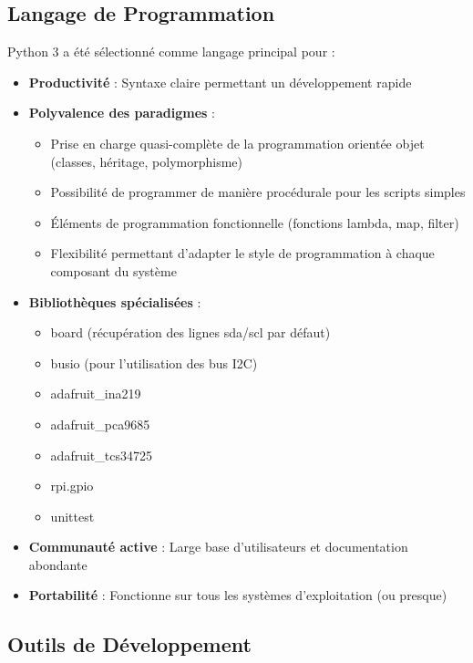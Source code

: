 \documentclass[a4paper, 12pt]{article}
\begin{document}
	
	\subsection{Langage de Programmation}
	
	Python 3 a été sélectionné comme langage principal pour :
	
	\begin{itemize}
		\item \textbf{Productivité} : Syntaxe claire permettant un développement rapide
		\item \textbf{Polyvalence des paradigmes} :
		\begin{itemize}
			\item Prise en charge quasi-complète de la programmation orientée objet (classes, héritage, polymorphisme)
			\item Possibilité de programmer de manière procédurale pour les scripts simples
			\item Éléments de programmation fonctionnelle (fonctions lambda, map, filter)
			\item Flexibilité permettant d'adapter le style de programmation à chaque composant du système
		\end{itemize}
		
		\item \textbf{Bibliothèques spécialisées} :
		\begin{itemize}
			\item board (récupération des lignes sda/scl par défaut)
			\item busio (pour l'utilisation des bus I2C)
			\item adafruit\_ina219
			\item adafruit\_pca9685
			\item adafruit\_tcs34725
			\item rpi.gpio
			\item unittest
		\end{itemize}
		
		\item \textbf{Communauté active} : Large base d'utilisateurs et documentation abondante
		\item \textbf{Portabilité} : Fonctionne sur tous les systèmes d'exploitation (ou presque)
	\end{itemize}
	
	
	
	\subsection{Outils de Développement}
	
\end{document}

